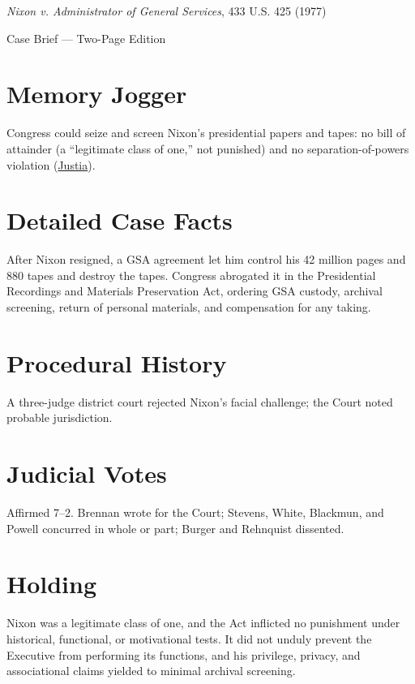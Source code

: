\documentclass[12pt]{article}
\begin{document}
\begin{center}
{\LARGE \textit{Nixon v. Administrator of General Services}, 433 U.S. 425 (1977)\par}
\vspace{0.5em}
{\large Case Brief --- Two-Page Edition\par}
\end{center}

\section{Memory Jogger}
Congress could seize and screen Nixon's presidential papers and tapes: no bill of attainder (a ``legitimate class of one,'' not punished) and no separation-of-powers violation (\href{https://supreme.justia.com/cases/federal/us/433/425/}{Justia}).

\section{Detailed Case Facts}
After Nixon resigned, a GSA agreement let him control his 42 million pages and 880 tapes and destroy the tapes. Congress abrogated it in the Presidential Recordings and Materials Preservation Act, ordering GSA custody, archival screening, return of personal materials, and compensation for any taking.

\section{Procedural History}
A three-judge district court rejected Nixon's facial challenge; the Court noted probable jurisdiction.

\section{Judicial Votes}
Affirmed 7--2. Brennan wrote for the Court; Stevens, White, Blackmun, and Powell concurred in whole or part; Burger and Rehnquist dissented.

\section{Holding}
Nixon was a legitimate class of one, and the Act inflicted no punishment under historical, functional, or motivational tests. It did not unduly prevent the Executive from performing its functions, and his privilege, privacy, and associational claims yielded to minimal archival screening.
\end{document}
